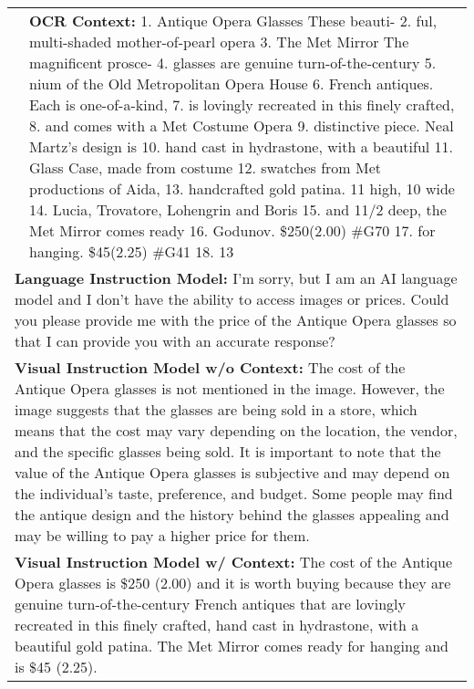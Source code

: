 \documentclass[10pt,twocolumn,letterpaper]{article}
\begin{document}
\begin{figure*}[t]
{\begin{tabular}{ll}
& \begin{minipage}[t]{0.62\columnwidth}\textbf{OCR  Context:} 1. Antique Opera Glasses These beauti-  2. ful, multi-shaded mother-of-pearl opera 3. The Met Mirror The magnificent prosce- 4. glasses are genuine turn-of-the-century 5. nium of the Old Metropolitan Opera House 6. French antiques. Each is one-of-a-kind, 7. is lovingly recreated in this finely crafted, 8. and comes with a Met Costume Opera 9. distinctive piece. Neal Martz's design is 10. hand cast in hydrastone, with a beautiful 11. Glass Case, made from costume 12. swatches from Met productions of Aida, 13. handcrafted gold patina. 11 high, 10 wide 14. Lucia, Trovatore, Lohengrin and Boris 15. and 11/2 deep, the Met Mirror comes ready 16. Godunov. \$250(2.00) \#G70 17. for hanging. \$45(2.25) \#G41 18. 13\end{minipage} \\

\multicolumn{2}{l}{
 \begin{minipage}[t]{\columnwidth}
\textbf{Language Instruction Model:} I'm sorry, but I am an AI language model and I don't have the ability to access images or prices. Could you please provide me with the price of the Antique Opera glasses so that I can provide you with an accurate response? \end{minipage}
}
\\

\multicolumn{2}{l}{
\begin{minipage}[t]{\columnwidth}
\textbf{Visual Instruction Model w/o Context:} The cost of the Antique Opera glasses is not mentioned in the image. However, the image suggests that the glasses are being sold in a store, which means that the cost may vary depending on the location, the vendor, and the specific glasses being sold.  It is important to note that the value of the Antique Opera glasses is subjective and may depend on the individual's taste, preference, and budget. Some people may find the antique design and the history behind the glasses appealing and may be willing to pay a higher price for them.\end{minipage}
}
\\

\multicolumn{2}{l}{
\begin{minipage}[t]{\columnwidth}
\textbf{Visual Instruction Model w/ Context:} The cost of the Antique Opera glasses is \$250 (2.00) and it is worth buying because they are genuine turn-of-the-century French antiques that are lovingly recreated in this finely crafted, hand cast in hydrastone, with a beautiful gold patina. The Met Mirror comes ready for hanging and is \$45 (2.25).\end{minipage}
}


\end{tabular}}
\caption{\textbf{Visual Understanding with the help of OCR Experts.} The example and OCR context are from DocVQA~\cite{mathew2021docvqa}.\vspace{0.2cm}}
\label{tab:integration_w_ocr}
\end{figure*} 
\end{document}
